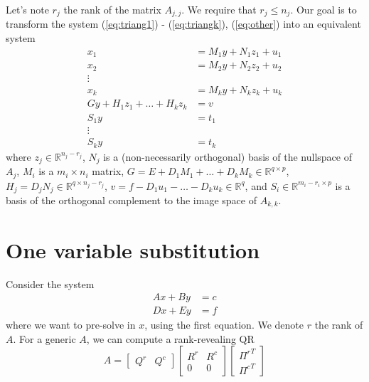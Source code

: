 \documentclass[]{article}
\newcommand{\BIN}{\begin{bmatrix}}
\newcommand{\BOUT}{\end{bmatrix}}
\begin{document}
Let's note $r_j$ the rank of the matrix $A_{j,j}$. We require that $r_j \leq n_j$.
Our goal is to transform the system (\ref{eq:triang1}) - (\ref{eq:triangk}), (\ref{eq:other}) into an equivalent system
\begin{align}
  x_1 &= M_1 y + N_1 z_1 + u_1 \\
	x_2 &= M_2 y + N_2 z_2 + u_2 \\
  \vdots & \nonumber \\
	x_k &= M_k y + N_k z_k + u_k \\
	G y + H_1 z_1 + \ldots + H_k z_k &= v \\
	S_1 y &= t_1 \\
	\vdots \nonumber \\
	S_k y &= t_k
\end{align}
where $z_j \in \mathbb{R}^{n_j-r_j}$, $N_j$ is a (non-necessarily orthogonal) basis of the nullspace of $A_j$, $M_i$ is a $m_i \times n_i$ matrix, $G = E + D_1 M_1 + \ldots + D_k M_k \in \mathbb{R}^{q\times p}$, $H_j = D_j N_j \in \mathbb{R}^{q\times n_j-r_j}$, $v = f - D_1 u_1 - \ldots - D_k u_k \in \mathbb{R}^q$, and $S_i \in \mathbb{R}^{m_i-r_i \times p}$ is a basis of the orthogonal complement to the image space of $A_{k,k}$.


\section{One variable substitution}
Consider the system
\begin{align}
	A x + B y &= c \label{eq:simple1}\\
	D x + E y &= f \label{eq:simple2}
\end{align}
where we want to pre-solve in $x$, using the first equation. We denote $r$ the rank of $A$. For a generic $A$, we can compute a rank-revealing QR
\begin{equation}
	A = \BIN Q^r & Q^c \BOUT \BIN R^r & R^c \\ 0 & 0 \BOUT \BIN {\Pi^r}^T \\ {\Pi^c}^T \BOUT
\end{equation}
\end{document}
